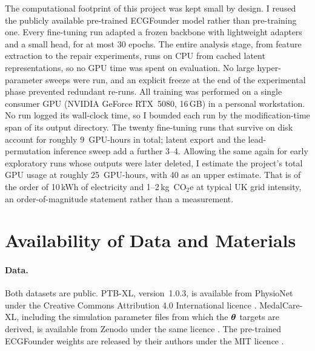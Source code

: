 The computational footprint of this project was kept small by design. I reused the publicly available pre-trained ECGFounder model rather than pre-training one. Every fine-tuning run adapted a frozen backbone with lightweight adapters and a small head, for at most 30 epochs. The entire analysis stage, from feature extraction to the repair experiments, runs on CPU from cached latent representations, so no GPU time was spent on evaluation. No large hyper-parameter sweeps were run, and an explicit freeze at the end of the experimental phase prevented redundant re-runs. All training was performed on a single consumer GPU (NVIDIA GeForce RTX~5080, 16\,GB) in a personal workstation. No run logged its wall-clock time, so I bounded each run by the modification-time span of its output directory. The twenty fine-tuning runs that survive on disk account for roughly 9~GPU-hours in total; latent export and the lead-permutation inference sweep add a further 3--4. Allowing the same again for early exploratory runs whose outputs were later deleted, I estimate the project's total GPU usage at roughly 25~GPU-hours, with 40 as an upper estimate. That is of the order of 10\,kWh of electricity and 1--2\,kg~CO$_2$e at typical UK grid intensity, an order-of-magnitude statement rather than a measurement. 

\section{Availability of Data and Materials}
\label{sec:decl-data}

\paragraph{Data.} Both datasets are public. PTB-XL, version~1.0.3, is available from PhysioNet under the Creative Commons Attribution 4.0 International licence \citep{wagner2020ptbxl}. MedalCare-XL, including the simulation parameter files from which the $\boldsymbol{\theta}$ targets are derived, is available from Zenodo under the same licence \citep{gillette2023medalcare}. The pre-trained ECGFounder weights are released by their authors under the MIT licence \citep{li2024ecgfounder}.


